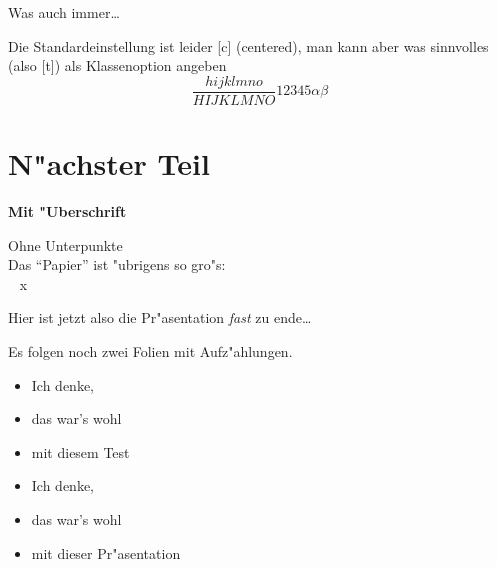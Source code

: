 \documentclass[accentcolor=tud1a,colorbacktitle,inverttitle,landscape,german,presentation,t]{tudbeamer}
\begin{document}
		\begin{frame}[c]
		\transdissolve[duration=0.5]
			Was auch immer\dots

			Die Standardeinstellung ist leider [c] (centered), man
			kann aber was sinnvolles (also [t]) als Klassenoption angeben
			\begin{equation*}
				\frac{hijklmno}{HIJKLMNO}12345\alpha \beta
			\end{equation*}
		\end{frame}

\section{N"achster Teil}
	
	\begin{frame}
		{\bf Mit "Uberschrift}

		Ohne Unterpunkte\\

		Das "`Papier"' ist "ubrigens so gro"s:\\
		\the\paperheight ~ x~ \the\paperwidth
	\end{frame}

	\begin{frame}
		Hier ist jetzt also die Pr"asentation \emph{fast}
		zu ende\dots
		
		Es folgen noch zwei Folien mit Aufz"ahlungen.
	\end{frame}

	\begin{frame}
		\begin{itemize}
			\item Ich denke,
			\item das war's wohl
			\item mit diesem Test
		\end{itemize}
	\end{frame}

	\begin{frame}
		\begin{itemize}
			\item Ich denke,
			\item das war's wohl
			\item mit dieser Pr"asentation
		\end{itemize}
	\end{frame}
\end{document}
